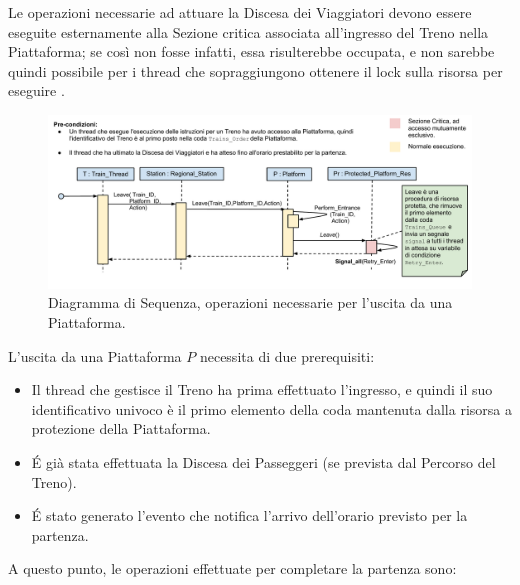 \begin{description}
	Le operazioni necessarie ad attuare la Discesa dei Viaggiatori devono essere eseguite esternamente alla Sezione critica associata all'ingresso del Treno nella Piattaforma; se così non fosse infatti, essa risulterebbe occupata, e non sarebbe quindi possibile per i thread che sopraggiungono ottenere il lock sulla risorsa per eseguire .
	
	\item{}

		\begin{figure}[htbp]
			\includegraphics[trim = 45mm 0mm 0mm 0mm,scale=0.55]{imgs/platform_exit_Sequence_Diagram.pdf}
			\caption{\footnotesize{Diagramma di Sequenza, operazioni necessarie per l'uscita da una Piattaforma.}}
			\label{fig:platform_access}
		\end{figure}
		
		L'uscita da una Piattaforma $P$ necessita di due prerequisiti:
		
			\begin{itemize}
				\item Il thread che gestisce il Treno ha prima effettuato l'ingresso, e quindi il suo identificativo univoco è il primo elemento della coda  mantenuta dalla risorsa a protezione della Piattaforma.
				\item \'E già stata effettuata la Discesa dei Passeggeri (se prevista dal Percorso del Treno).
				\item \'E stato generato l'evento che notifica l'arrivo dell'orario previsto per la partenza.
			\end{itemize}
		
		A questo punto, le operazioni effettuate per completare la partenza sono:
		

\end{description}
